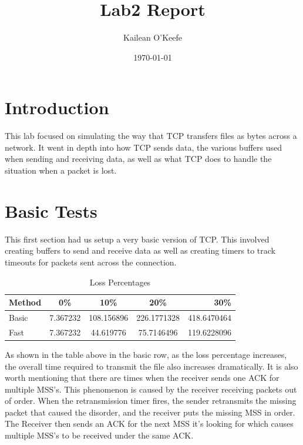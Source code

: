 \documentclass[a4paper,11pt]{article}
\begin{document}
\title{Lab2 Report}
\author{Kailean O'Keefe}
\date{\today}
\maketitle

\section*{Introduction}
This lab focused on simulating the way that TCP transfers files as bytes across a network. It went in depth into how TCP sends data, the various buffers used when sending and receiving data, as well as what TCP does to handle the situation when a packet is lost. 

\section*{Basic Tests}
This first section had us setup a very basic version of TCP. This involved creating buffers to send and receive data as well as creating timers to track timeouts for packets sent across the connection.

\begin{table}[h!]
  \begin{center}
    \caption{Loss Percentages}
    \label{tab:table1}
    \begin{tabular}{l|c|c|c|r} %
      \textbf{Method} & \textbf{0\%} & \textbf{10\%} & \textbf{20\%} & \textbf{30\%}\\
      \hline
      Basic & 7.367232 & 108.156896  & 226.1771328 & 418.6470464\\
      Fast & 7.367232 & 44.619776  & 75.7146496 & 119.6228096\\
    \end{tabular}
  \end{center}
\end{table}

As shown in the table above in the basic row, as the loss percentage increases, the overall time required to transmit the file also increases dramatically. It is also worth mentioning that there are times when the receiver sends one ACK for multiple MSS's. This phenomenon is caused by the receiver receiving packets out of order. When the retransmission timer fires, the sender retransmits the missing packet that caused the disorder, and the receiver puts the missing MSS in order. The Receiver then sends an ACK for the next MSS it's looking for which causes multiple MSS's to be received under the same ACK.  
\end{document}
